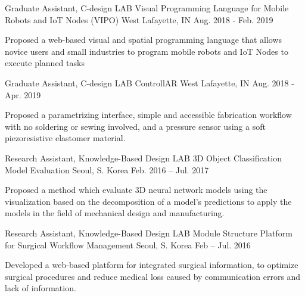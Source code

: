 \begin{cventries}


\cventry
{Graduate Assistant, C-design LAB} %
{Visual Programming Language for Mobile Robots and IoT Nodes (VIPO)} %
{West Lafayette, IN} %
{Aug. 2018 - Feb. 2019} %
{ %
\begin{cvitems}
\item {Proposed a web-based visual and spatial programming language that allows novice users and small industries to program mobile robots and IoT Nodes to execute planned tasks}
\end{cvitems} 
}


\cventry
{Graduate Assistant, C-design LAB} %
{ControllAR} %
{West Lafayette, IN} %
{Aug. 2018 - Apr. 2019} %
{ %
\begin{cvitems}
\item {Proposed a parametrizing interface, simple and accessible fabrication workflow with no soldering or sewing involved, and a pressure sensor using a soft piezoresistive elastomer material.}
\end{cvitems}
}


\cventry
{Research Assistant, Knowledge-Based Design LAB} %
{3D Object Classification Model Evaluation} %
{Seoul, S. Korea} %
{Feb. 2016 – Jul. 2017} %
{ %
\begin{cvitems}
\item {Proposed a method which evaluate 3D neural network models using the visualization based on the decomposition of a model’s predictions to apply the models in the field of mechanical design and manufacturing.}
\end{cvitems}
}

\cventry
{Research Assistant, Knowledge-Based Design LAB} %
{Module Structure Platform for Surgical Workflow Management} %
{Seoul, S. Korea} %
{Feb – Jul. 2016} %
{ %
\begin{cvitems}
\item {Developed a web-based platform for integrated surgical information, to optimize surgical procedures and reduce medical loss caused by communication errors and lack of information.}
\end{cvitems}
}


\end{cventries}